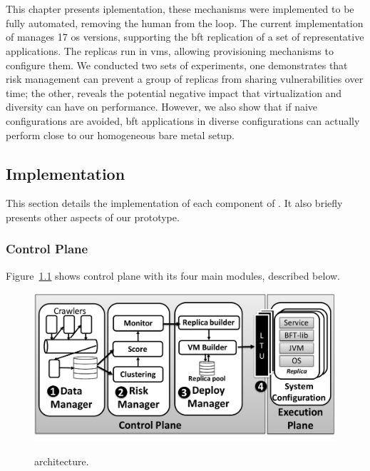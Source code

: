 \chapter{\system}
\label{chap:lazarus_implementation}
This chapter presents \system iplementation, these mechanisms were implemented to be fully automated, removing the human from the loop.
The current implementation of \system manages 17 \gls{os} versions, supporting the \gls{bft} replication of a set of representative applications.
The replicas run in \glspl{vm}, allowing provisioning mechanisms to configure them. 
We conducted two sets of experiments, one demonstrates that \system risk management can prevent a group of replicas from sharing vulnerabilities over time; the other, reveals the potential negative impact that virtualization and diversity can have on performance. However, we also show that if naive configurations are avoided, \gls{bft} applications in diverse configurations can actually perform close to our homogeneous bare metal setup.


\section{Implementation}
\label{sec:implementation}

This section details the implementation of each component of \system. 
It also briefly presents other aspects of our prototype.%


\subsection{Control Plane}
\label{sec:lazarus}

Figure~\ref{fig:arch1} shows \system control plane with its four main modules, described below.

\begin{figure}[h]
\begin{center}
\includegraphics[width=.9\columnwidth]{images/images/architecture_new.pdf}
\vspace{-5mm}
\caption{\system architecture.}
\vspace{-5mm}
\label{fig:arch1}
\end{center}
\end{figure}


